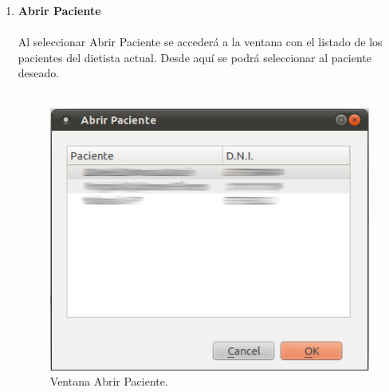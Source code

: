 \begin{enumerate}
\begin{enumerate}
\end{enumerate}
\item \textbf{Abrir Paciente}\\\\
Al seleccionar Abrir Paciente se accederá a la ventana con el listado de los pacientes del dietista actual. Desde aquí se podrá seleccionar al paciente deseado.\\\\
\begin{figure}[H]
  \label{abrir_paciente}
  \begin{center}
    \includegraphics[scale=0.5]{../../Image/paciente-abrir.png}
  \end{center}
  \caption{Ventana Abrir Paciente.}
\end{figure}


\end{enumerate}
